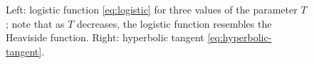 \documentclass[12pt, a4paper, twoside, openright, notitlepage]{report}
\numberwithin{equation}{chapter}
\theoremstyle{theorem}
\theoremstyle{definition}
\theoremstyle{remark}
\theoremstyle{proposition}
\numberwithin{figure}{chapter}
\begin{document}
\begin{figure}[t]
			
			\caption{Left: logistic function \eqref{eq:logistic} for three values of the parameter $T$; note that as $T$ decreases, the logistic function resembles the Heaviside function. Right: hyperbolic tangent \eqref{eq:hyperbolic-tangent}.}
			\label{fig:activation-functions}
		\end{figure}
		
		\vspace*{0.3cm}
		
\end{document}
